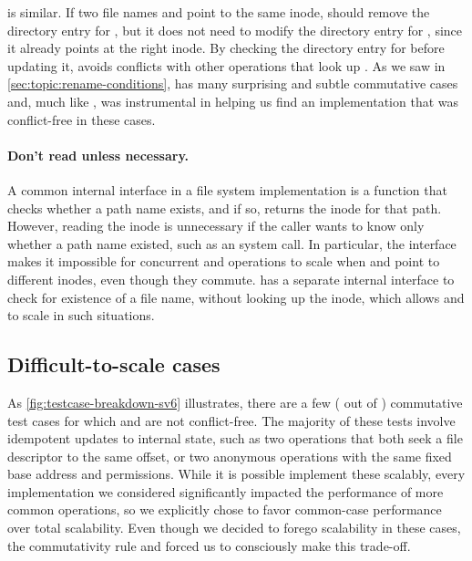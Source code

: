  is similar.  If two file names  and 
point to the
same inode,  should remove the directory entry for
, but it does not need to modify the directory entry for
, since
it already points at the right inode.  By checking the directory
entry for  before updating it,  avoids
conflicts with other operations that look up .
%
As we saw in \cref{sec:topic:rename-conditions},  has
many surprising and subtle commutative cases and, much like
, \tool was instrumental in helping us find an
implementation that was conflict-free in these cases.


\paragraph{Don't read unless necessary.}  A common internal interface
in a file system implementation is a  function that
checks whether a path name exists, and if so, returns the inode for
that path.
%
However, reading the inode is unnecessary
if the caller wants to know only whether a path name existed, such as
an  system call.  In particular, the 
interface makes it impossible for concurrent 
and  operations to scale when  and 
point to different inodes, even though they commute.
\fs has a separate internal interface to check for existence of a
file name, without looking up the inode, which allows 
and  to scale in such situations.


\subsection{Difficult-to-scale cases}

As \cref{fig:testcase-breakdown-sv6} illustrates, there are a few
( out of )
commutative test cases for
which \vm and \fs are not conflict-free.
%
The majority of these tests involve idempotent updates to internal
state, such as two  operations that both seek a file
descriptor to the same offset, or two anonymous  operations
with the same fixed base address and permissions.  While it is
possible implement these scalably, every implementation we considered
significantly impacted the performance of more common operations, so
we explicitly chose to favor common-case performance over total
scalability.  Even though we decided to forego scalability in these
cases, the commutativity rule and \tool forced us to consciously make
this trade-off.
%


